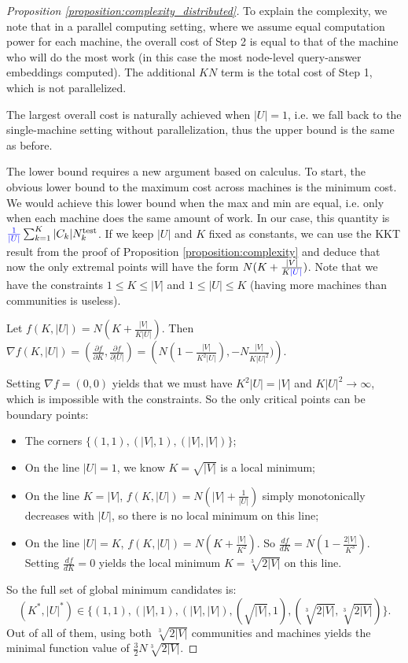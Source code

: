 \begin{proof}[Proposition \ref{proposition:complexity_distributed}]
    To explain the complexity, we note that in a parallel computing setting, where we assume equal computation power for each machine, the overall cost of Step 2 is equal to that of the machine who will do the most work (in this case the most node-level query-answer embeddings computed). The additional $KN$ term is the total cost of Step 1, which is not parallelized.

    The largest overall cost is naturally achieved when $|U|=1$, i.e. we fall back to the single-machine setting without parallelization, thus the upper bound is the same as before.

    The lower bound requires a new argument based on calculus. To start, the obvious lower bound to the maximum cost across machines is the minimum cost. We would achieve this lower bound when the max and min are equal, i.e. only when each machine does the same amount of work. In our case, this quantity is $\textcolor{blue}{\frac{1}{|U|}}\sum_{k=1}^{K}{|C_k|N_k^{\text{test}}}$. If we keep $|U|$ and $K$ fixed as constants, we can use the KKT result from the proof of Proposition \ref{proposition:complexity} and deduce that now the only extremal points will have the form $N(K+\frac{|V|}{K\textcolor{blue}{|U|}})$. Note that we have the constraints $1 \leq K \leq |V|$ and $1 \leq |U| \leq K$ (having more machines than communities is useless).

    Let $f(K, |U|)=N(K+\frac{|V|}{K|U|})$. Then $\nabla f (K, |U|)=\left(\frac{\partial f}{\partial K},\frac{\partial f}{\partial |U|}\right)=\left(N(1-\frac{|V|}{K^2|U|}), -N\frac{|V|}{K|U|^2})\right)$.

    Setting $\nabla f = (0, 0)$ yields that we must have $K^2|U|=|V|$ and $K|U|^2 \to \infty$, which is impossible with the constraints. So the only critical points can be boundary points:
    \begin{itemize}
        \item The corners $\{(1, 1), (|V|, 1), (|V|,|V|)\}$;
        \item On the line $|U|=1$, we know $K=\sqrt{|V|}$ is a local minimum;
        \item On the line $K=|V|$, $f(K, |U|)=N(|V|+\frac{1}{|U|})$ simply monotonically decreases with $|U|$, so there is no local minimum on this line;
        \item On the line $|U|=K$, $f(K, |U|)=N(K+\frac{|V|}{K^2})$. So $\frac{d f}{d K}=N(1-\frac{2|V|}{K^3})$. Setting $\frac{d f}{d K}=0$ yields the local minimum $K=\sqrt[3]{2|V|}$ on this line.
    \end{itemize}
    So the full set of global minimum candidates is: $$(K^*, |U|^*) \in \{(1, 1), (|V|, 1), (|V|,|V|), (\sqrt{|V|}, 1), (\sqrt[3]{2|V|}, \sqrt[3]{2|V|}) \}.$$ Out of all of them, using both $\sqrt[3]{2|V|}$ communities and machines yields the minimal function value of $\frac{3}{2}N\sqrt[3]{2|V|}$.
\end{proof}

